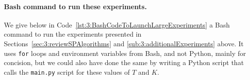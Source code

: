 




\paragraph{Bash command to run these experiments.}
%
We give below in Code~\ref{lst:3:BashCodeToLaunchLargeExperiments} a Bash command to run the experiments presented in Sections~\ref{sec:3:reviewSPAlgorithms} and \ref{sub:3:additionalExperiments} above.
It uses \texttt{for} loops and environment variables from Bash, and not Python, mainly for concision,
but we could also have done the same by writing a Python script that calls the \texttt{main.py} script for these values of $T$ and $K$.

